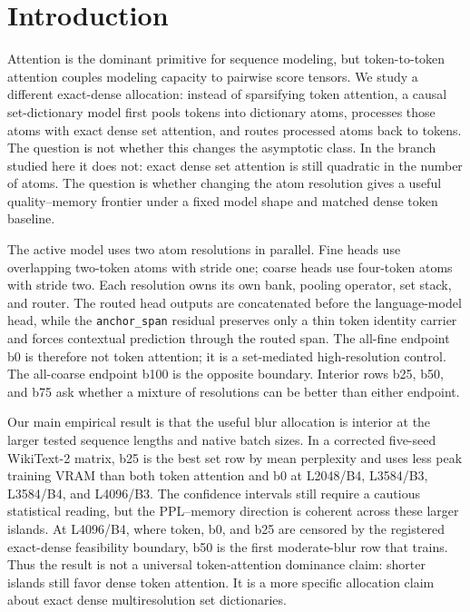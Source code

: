 \documentclass{article}
\theoremstyle{plain}
\theoremstyle{definition}
\theoremstyle{remark}
\begin{document}
\section{Introduction}

Attention is the dominant primitive for sequence modeling, but token-to-token
attention couples modeling capacity to pairwise score tensors.  We study a
different exact-dense allocation: instead of sparsifying token attention, a
causal set-dictionary model first pools tokens into dictionary atoms, processes
those atoms with exact dense set attention, and routes processed atoms back to
tokens.  The question is not whether this changes the asymptotic class.  In
the branch studied here it does not: exact dense set attention is still
quadratic in the number of atoms.  The question is whether changing the atom
resolution gives a useful quality--memory frontier under a fixed model shape
and matched dense token baseline.

The active model uses two atom resolutions in parallel.  Fine heads use
overlapping two-token atoms with stride one; coarse heads use four-token atoms
with stride two.  Each resolution owns its own bank, pooling operator, set
stack, and router.  The routed head outputs are concatenated before the
language-model head, while the \texttt{anchor\_span} residual preserves only a
thin token identity carrier and forces contextual prediction through the routed
span.  The all-fine endpoint b0 is therefore not token attention; it is a
set-mediated high-resolution control.  The all-coarse endpoint b100 is the
opposite boundary.  Interior rows b25, b50, and b75 ask whether a mixture of
resolutions can be better than either endpoint.

Our main empirical result is that the useful blur allocation is interior at
the larger tested sequence lengths and native batch sizes.  In a corrected
five-seed WikiText-2 matrix,
b25 is the best set row by mean perplexity and uses less peak training VRAM
than both token attention and b0 at L2048/B4, L3584/B3, L3584/B4, and
L4096/B3.  The confidence intervals still require a cautious statistical
reading, but the PPL--memory direction is coherent across these larger
islands.  At L4096/B4, where token, b0, and b25 are censored by the registered
exact-dense feasibility boundary, b50 is the first moderate-blur row that
trains.  Thus the result is not a universal token-attention dominance claim:
shorter islands still favor dense token attention.  It is a more specific
allocation claim about exact dense multiresolution set dictionaries.
\end{document}
